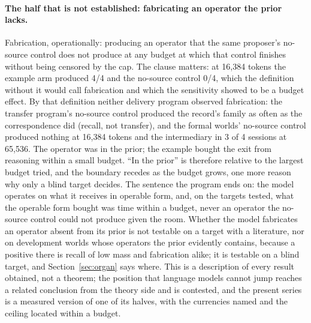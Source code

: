 \documentclass[11pt]{article}
\begin{document}
\paragraph{The half that is not established: fabricating an operator the
prior lacks.} Fabrication, operationally: producing an operator that the
same proposer's no-source control does not produce at any budget at which
that control finishes without being censored by the cap. The clause
matters: at 16{,}384 tokens the example arm produced 4/4 and the no-source
control 0/4, which the definition without it would call fabrication and
which the sensitivity showed to be a budget effect. By that definition
neither delivery program observed fabrication: the transfer program's
no-source control produced the record's family as often as the
correspondence did (recall, not transfer), and the formal worlds' no-source
control produced nothing at 16{,}384 tokens and the intermediary in 3 of 4
sessions at 65{,}536. The operator was in the prior; the example bought the
exit from reasoning within a small budget. ``In the prior'' is therefore
relative to the largest budget tried, and the boundary recedes as the
budget grows, one more reason why only a blind target decides. The
sentence the program ends on: the model operates on what it receives in
operable form, and, on the targets tested, what the operable form bought
was time within a budget, never an operator the no-source control could
not produce given the room. Whether the model fabricates an operator absent
from its prior is not testable on a target with a literature, nor on
development worlds whose operators the prior evidently contains, because a
positive there is recall of low mass and fabrication alike; it is testable
on a blind target, and Section~\ref{sec:organ} says where. This is a
description of every result obtained, not a theorem; the position that
language models cannot jump \citep{zahavy2026jump} reaches a related
conclusion from the theory side and is contested, and the present series is
a measured version of one of its halves, with the currencies named and the
ceiling located within a budget.
\end{document}
